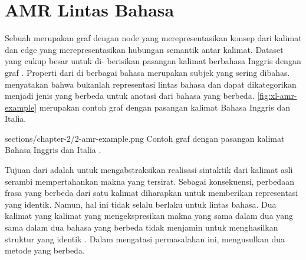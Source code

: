 \section{AMR  Lintas Bahasa}

Sebuah \AMR{} merupakan graf dengan node yang merepresentasikan konsep dari kalimat dan edge yang merepresentasikan hubungan semantik antar kalimat.
Dataset \AMR{} yang cukup besar untuk di- berisikan pasangan kalimat berbahasa Inggris dengan graf \AMR{}.
Properti \crosslingual{} dari \AMR{} di berbagai bahasa merupakan subjek yang sering dibahas.
\textcite{banarescu2013} menyatakan bahwa \AMR{} bukanlah representasi lintas bahasa dan dapat dikategorikan menjadi jenis \AMR{} yang berbeda untuk anotasi dari bahasa yang berbeda.
\cref{fig:xl-amr-example} merupakan contoh graf \AMR{} dengan pasangan kalimat Bahasa Inggris dan Italia.

  {sections/chapter-2/2-amr-example.png}
  {Contoh graf \AMR{} dengan pasangan kalimat Bahasa Inggris dan Italia .}

Tujuan dari \AMR{} adalah untuk mengabstraksikan realisasi sintaktik dari kalimat asli serambi mempertahankan makna yang tersirat.
Sebagai konsekuensi, perbedaan frasa yang berbeda dari satu kalimat diharapkan untuk memberikan representasi \AMR{} yang identik.
Namun, hal ini tidak selalu berlaku untuk lintas bahasa.
Dua kalimat yang kalimat yang mengekspresikan makna yang sama dalam dua yang sama dalam dua bahasa yang berbeda tidak menjamin untuk menghasilkan struktur \AMR{} yang identik .
Dalam mengatasi permasalahan ini, \textcite{damonte2018} mengusulkan dua metode yang berbeda.

